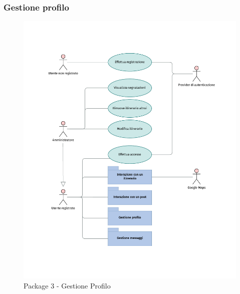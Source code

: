 \documentclass{natourDoc}
\begin{document}
	\subsubsection{Gestione profilo}
	\begin{figure}[!htbp]
		\centering
		\includegraphics[width=\textwidth, page=5]{./diagrams/useCase.pdf}
		\caption{Package 3 - Gestione Profilo}
	\end{figure}
	\FloatBarrier

	\newpage
\end{document}
